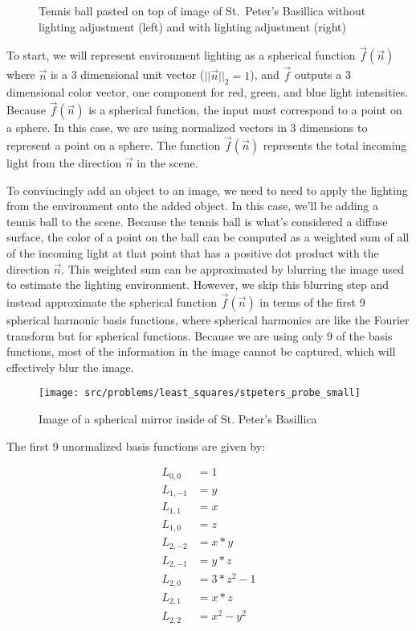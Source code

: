 \begin{Parts}
\begin{figure}
\caption{Tennis ball pasted on top of image of St.~Peter's Basillica without lighting adjustment (left) and with lighting adjustment (right)
}\label{fig:noshade}
\end{figure}

To start, we will represent environment lighting as a spherical function $\vec{f}(\vec{n})$ where $\vec{n}$ is a 3 dimensional unit vector ($\lvert\lvert\vec{n}\rvert\rvert_2=1$), and $\vec{f}$ outputs a 3 dimensional color vector, one component for red, green, and blue light intensities.  Because $\vec{f}(\vec{n})$ is a spherical function, the input must correspond to a point on a sphere. In this case, we are using normalized vectors in 3 dimensions to represent a point on a sphere.  The function $\vec{f}(\vec{n})$ represents the total incoming light from the direction $\vec{n}$ in the scene.

To convincingly add an object to an image, we need to need to apply the lighting from the environment onto the added object.  In this case, we'll be adding a tennis ball to the scene.  Because the tennis ball is what's considered a diffuse surface, the color of a point on the ball can be computed as a weighted sum of all of the incoming light at that point that has a positive dot product with the direction $\vec{n}$.  This weighted sum can be approximated by blurring the image used to estimate the lighting environment.  However, we skip this blurring step and instead approximate the spherical function $\vec{f}(\vec{n})$ in terms of the first 9 spherical harmonic basis functions, where spherical harmonics are like the Fourier transform but for spherical functions.  Because we are using only 9 of the basis functions, most of the information in the image cannot be captured, which will effectively blur the image.

\begin{figure}
\centering
\texttt{[image: src/problems/least\_squares/stpeters\_probe\_small]}
\caption{Image of a spherical mirror inside of St. Peter's Basillica}
\label{fig:probe}
\end{figure}

The first 9 unormalized basis functions are given by:

\begin{align*}
L_{0,0}&=1\\
L_{1,-1}&=y\\
L_{1,1}&=x\\
L_{1,0}&=z\\
L_{2,-2}&=x*y\\
L_{2,-1}&=y*z\\
L_{2,0}&=3*z^2-1\\
L_{2,1}&=x*z\\
L_{2,2}&=x^2-y^2
\end{align*}


\end{Parts}
